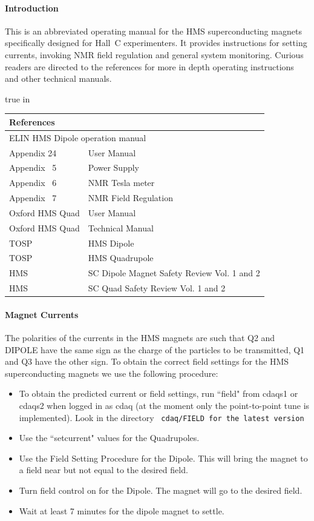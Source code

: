 \paragraph{Introduction}

This is an abbreviated operating manual for the HMS superconducting
magnets specifically designed for Hall~C experimenters. It provides
instructions for setting currents, invoking NMR field regulation and
general system monitoring.  Curious readers are directed to the
references for more in depth operating instructions and other technical
manuals.

 true in
\begin{center}
\begin{tabular}{ll}
\multicolumn{2}{l}{\bf References}\\
\hline
\multicolumn{2}{l}{ELIN HMS Dipole operation manual}\\
Appendix 24 &  User Manual \\
Appendix ~5 &  Power Supply \\
Appendix ~6 &  NMR Tesla meter \\
Appendix ~7 &  NMR Field Regulation \\
Oxford HMS Quad & User Manual \\
Oxford HMS Quad & Technical Manual \\
TOSP & HMS Dipole \\
TOSP & HMS Quadrupole \\
HMS & SC Dipole Magnet Safety Review Vol. 1 and 2 \\
HMS & SC Quad Safety Review Vol. 1 and 2 
\end{tabular}
\end{center}

\paragraph{Magnet Currents}

The polarities of the currents in the HMS magnets are such that
Q2 and DIPOLE have the same sign as the charge of the particles
to be transmitted, Q1 and Q3 have the other sign.
To obtain the correct field settings for the HMS superconducting magnets
we use the following procedure:

\begin{itemize}
\item{To obtain the predicted current or field settings, run ``field" from
cdaqs1 or cdaqs2 when logged in as cdaq (at the moment
only the point-to-point tune is implemented). Look in the directory 
{\tt ~cdaq/FIELD for the latest version}}
\item{Use the ``setcurrent" values for the Quadrupoles.}
\item{Use the Field Setting Procedure for the Dipole. This will bring the
magnet to a field near but not equal to the desired field.}
\item{Turn field control on for the Dipole. The magnet will go to the
desired field.}
\item{Wait at least 7 minutes for the dipole magnet to settle.}
\end{itemize}

